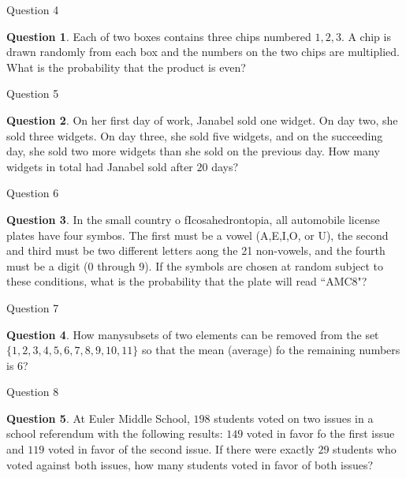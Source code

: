 \documentclass[handout]{beamer}
\theoremstyle{definition}
\newtheorem{quest}{Question}
\begin{document}
\begin{frame}{Question 4}
\begin{quest}
Each of two boxes contains three chips numbered $1,2,3$.  A chip is drawn randomly from each box and the numbers on the two chips are multiplied.  What is the probability that the product is even?
\end{quest}
\end{frame}

\begin{frame}{Question 5}
\begin{quest}
On her first day of work, Janabel sold one widget.  On day two, she sold three widgets.  On day three, she sold five widgets, and on the succeeding day, she sold two more widgets than she sold on the previous day.  How many widgets in total had Janabel sold after $20$ days?
\end{quest}
\end{frame}

\begin{frame}{Question 6}
\begin{quest}
In the small country o fIcosahedrontopia, all automobile license plates have four symbos.  The first must be a vowel (A,E,I,O, or U), the second and third must be two different letters aong the 21 non-vowels, and the fourth must be a digit (0 through 9).  If the symbols are chosen at random subject to these conditions, what is the probability that the plate will read ``AMC8"?
\end{quest}
\end{frame}

\begin{frame}{Question 7}
\begin{quest}
How manysubsets of two elements can be removed from the set $\{1,2,3,4,5,6,7,8,9,10,11\}$ so that the mean (average) fo the remaining numbers is $6$?
\end{quest}
\end{frame}

\begin{frame}{Question 8}
\begin{quest}
At Euler Middle School, $198$ students voted on two issues in a school referendum with the following results: $149$ voted in favor fo the first issue and $119$ voted in favor of the second issue.  If there were exactly $29$ students who voted against both issues, how many students voted in favor of both issues?
\end{quest}
\end{frame}
\end{document}

